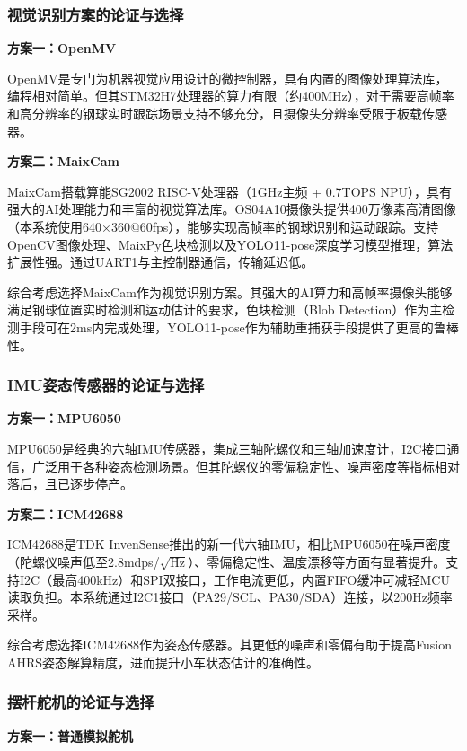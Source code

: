 \documentclass[12pt,a4paper]{ctexart}
\begin{document}
\subsubsection{\textbf{视觉识别方案的论证与选择}}

\textbf{方案一：OpenMV}

OpenMV是专门为机器视觉应用设计的微控制器，具有内置的图像处理算法库，编程相对简单。但其STM32H7处理器的算力有限（约400MHz），对于需要高帧率和高分辨率的钢球实时跟踪场景支持不够充分，且摄像头分辨率受限于板载传感器。

\textbf{方案二：MaixCam}

MaixCam搭载算能SG2002 RISC-V处理器（1GHz主频 + 0.7TOPS NPU），具有强大的AI处理能力和丰富的视觉算法库。OS04A10摄像头提供400万像素高清图像（本系统使用640×360@60fps），能够实现高帧率的钢球识别和运动跟踪。支持OpenCV图像处理、MaixPy色块检测以及YOLO11-pose深度学习模型推理，算法扩展性强。通过UART1与主控制器通信，传输延迟低。

综合考虑选择MaixCam作为视觉识别方案。其强大的AI算力和高帧率摄像头能够满足钢球位置实时检测和运动估计的要求，色块检测（Blob Detection）作为主检测手段可在2ms内完成处理，YOLO11-pose作为辅助重捕获手段提供了更高的鲁棒性。

\subsubsection{\textbf{IMU姿态传感器的论证与选择}}

\textbf{方案一：MPU6050}

MPU6050是经典的六轴IMU传感器，集成三轴陀螺仪和三轴加速度计，I2C接口通信，广泛用于各种姿态检测场景。但其陀螺仪的零偏稳定性、噪声密度等指标相对落后，且已逐步停产。

\textbf{方案二：ICM42688}

ICM42688是TDK InvenSense推出的新一代六轴IMU，相比MPU6050在噪声密度（陀螺仪噪声低至2.8mdps/$\sqrt{\text{Hz}}$）、零偏稳定性、温度漂移等方面有显著提升。支持I2C（最高400kHz）和SPI双接口，工作电流更低，内置FIFO缓冲可减轻MCU读取负担。本系统通过I2C1接口（PA29/SCL、PA30/SDA）连接，以200Hz频率采样。

综合考虑选择ICM42688作为姿态传感器。其更低的噪声和零偏有助于提高Fusion AHRS姿态解算精度，进而提升小车状态估计的准确性。

\subsubsection{\textbf{摆杆舵机的论证与选择}}

\textbf{方案一：普通模拟舵机}
\end{document}
